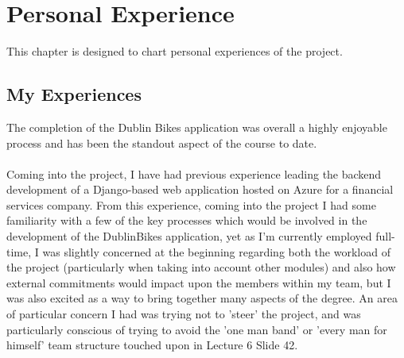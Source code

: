 \documentclass{scrreprt}
\begin{document}
\pagebreak
\chapter{Personal Experience}\label{PersonalExperience}
This chapter is designed to chart personal experiences of the project.

\section{My Experiences}\label{Experience}
The completion of the Dublin Bikes application was overall a highly enjoyable process and has been the standout aspect of the course to date. \\
\\
Coming into the project, I have had previous experience leading the backend development of a Django-based web application hosted on Azure for a financial services company. From this experience, coming into the project I had some familiarity with a few of the key processes which would be involved in the development of the DublinBikes application, yet as I'm currently employed full-time, I was slightly concerned at the beginning regarding both the workload of the project (particularly when taking into account other modules) and also how external commitments would impact upon the members within my team, but I was also excited as a way to bring together many aspects of the degree. An area of particular concern I had was trying not to 'steer' the project, and was particularly conscious of trying to avoid the 'one man band' or 'every man for himself' team structure touched upon in Lecture 6 Slide 42.\\
\\
\end{document}

